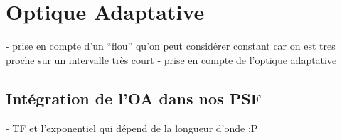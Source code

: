 \section{\centering Optique Adaptative}

- prise en compte d’un “flou” qu’on peut considérer constant car on est tres proche sur un intervalle très court
- prise en compte de l’optique adaptative

\subsection{Intégration de l’OA dans nos PSF}

- TF et l’exponentiel qui dépend de la longueur d’onde :P